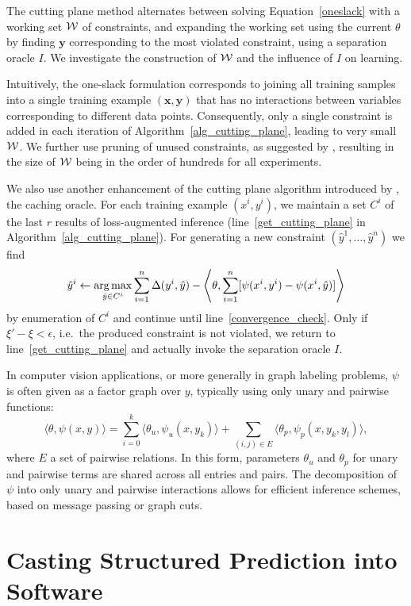 The cutting plane method alternates between solving Equation~\eqref{oneslack}
with a working set $\mathcal{W}$ of constraints, and expanding the working set using the
current $\theta$ by finding $\mathbf{y}$ corresponding to the most violated constraint,
using a separation oracle $I$.
We investigate the construction of $\mathcal{W}$ and the influence of $I$
on learning.


Intuitively, the one-slack formulation corresponds to joining all training
samples into a single training example $(\mathbf{x}, \mathbf{y})$ that has no
interactions between variables corresponding to different data points.
Consequently, only a single constraint is added in each iteration of
Algorithm~\ref{alg_cutting_plane}, leading to very small $\mathcal{W}$. We further use
pruning of unused constraints, as suggested by \citet{joachims2009cutting},
resulting in the size of $\mathcal{W}$ being in the order of hundreds for all experiments.

We also use another enhancement of the cutting plane algorithm introduced by
\citet{joachims2009cutting}, the caching oracle. For each training example $(x^i, y^i)$,
we maintain a set $C^i$ of the last $r$ results of loss-augmented inference
(line~\ref{get_cutting_plane} in Algorithm~\ref{alg_cutting_plane}).
For generating a new constraint $(\hat{y}^1, \dotsc, \hat{y}^n)$ we find
\[ 
    \hat{y}^i \leftarrow \operatorname*{arg\,max}_{\hat{y}\in C^i} \sum_{i=1}^n \Delta(y^i, \hat{y}) - \left \langle \theta, \sum_{i=1}^n [\psi(x^i, y^i) - \psi(x^i, \hat{y})] \right \rangle
\]
by enumeration of $C^i$ and continue until line~\ref{convergence_check}.
Only if $\xi' - \xi < \epsilon$, i.e.\ the produced constraint is not violated, we
return to line~\ref{get_cutting_plane} and actually invoke the separation
oracle $I$.

In computer vision applications, or more generally in graph labeling problems,
$\psi$ is often given as a factor graph over $y$, typically using only unary and pairwise functions:
\[ \langle \theta, \psi(x, y) \rangle = \sum_{i=0}^k \langle \theta_u,  \psi_u(x, y_k) \rangle + \sum_{(i, j) \in E} \langle \theta_p, \psi_p(x, y_k, y_l) \rangle, \]
where $E$ a set of pairwise relations. In this form, parameters $\theta_u$ and $\theta_p$ for unary and
pairwise terms are shared across all entries and pairs.
The decomposition of $\psi$ into only unary and pairwise interactions allows
for efficient inference schemes, based on message passing or graph cuts.


\section{Casting Structured Prediction into Software}\label{sec:api}

